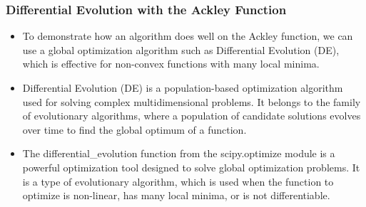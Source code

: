 \documentclass[
  letterpaper,
  DIV=11,
  numbers=noendperiod]{scrreprt}
\providecommand{\tightlist}{%
  \setlength{\itemsep}{0pt}\setlength{\parskip}{0pt}}\usepackage{longtable,booktabs,array}
\begin{document}
\subsubsection{Differential Evolution with the Ackley
Function}\label{differential-evolution-with-the-ackley-function}

\begin{itemize}
\tightlist
\item
  To demonstrate how an algorithm does well on the Ackley function, we
  can use a global optimization algorithm such as Differential Evolution
  (DE), which is effective for non-convex functions with many local
  minima.
\item
  Differential Evolution (DE) is a population-based optimization
  algorithm used for solving complex multidimensional problems. It
  belongs to the family of evolutionary algorithms, where a population
  of candidate solutions evolves over time to find the global optimum of
  a function.
\item
  The differential\_evolution function from the scipy.optimize module is
  a powerful optimization tool designed to solve global optimization
  problems. It is a type of evolutionary algorithm, which is used when
  the function to optimize is non-linear, has many local minima, or is
  not differentiable.
\end{itemize}
\end{document}
